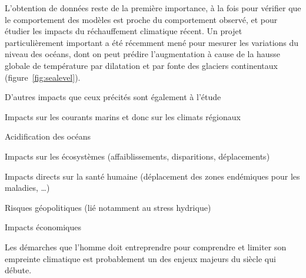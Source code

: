 \sk
L'obtention de données reste de la première importance, à la fois pour vérifier que le comportement des modèles est proche du comportement observé, et pour étudier les impacts du réchauffement climatique récent. Un projet particulièrement important a été récemment mené pour mesurer les variations du niveau des océans, dont on peut prédire l'augmentation à cause de la hausse globale de température par dilatation et par fonte des glaciers continentaux (figure~\ref{fig:sealevel}). 

\sk
D'autres impacts que ceux précités sont également à l'étude
\begin{citemize}
\item Impacts sur les courants marins et donc sur les climats régionaux
\item Acidification des océans
\item Impacts sur les écosystèmes (affaiblissements, disparitions, déplacements)
\item Impacts directs sur la santé humaine (déplacement des zones endémiques pour les maladies, \ldots)
\item Risques géopolitiques (lié notamment au stress hydrique) 
\item Impacts économiques
\end{citemize}
Les démarches que l'homme doit entreprendre pour comprendre et limiter son empreinte climatique est probablement un des enjeux majeurs du siècle qui débute.


